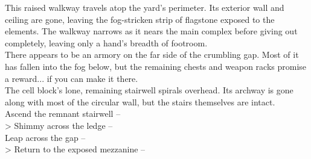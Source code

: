 This raised walkway travels atop the yard's perimeter. Its exterior wall and ceiling are gone, leaving the fog-stricken strip of flagstone exposed to the elements. The walkway narrows as it nears the main complex before giving out completely, leaving only a hand's breadth of footroom.\\

There appears to be an armory on the far side of the crumbling gap. Most of it has fallen into the fog below, but the remaining chests and weapon racks promise a reward... if you can make it there.\\

The cell block's lone, remaining stairwell spirals overhead. Its archway is gone along with most of the circular wall, but the stairs themselves are intact.\\

 Ascend the remnant stairwell -- \\
> Shimmy across the ledge -- \\
 Leap across the gap -- \\
> Return to the exposed mezzanine -- 